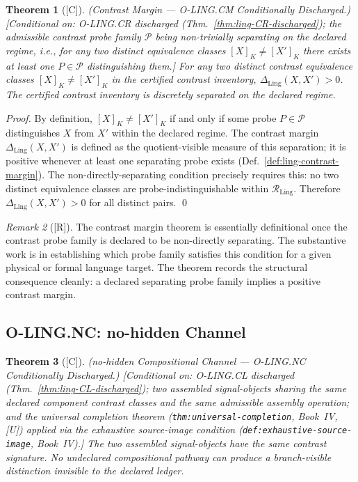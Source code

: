 \documentclass[12pt,oneside]{amsbook}
\theoremstyle{plain}
\newtheorem{theorem}{Theorem}[section]
\theoremstyle{definition}
\theoremstyle{remark}
\newtheorem{remark}[theorem]{Remark}
\newcommand{\status}[1]{\textup{[#1]}}
\begin{document}
\begin{theorem}[\status{C}]\label{thm:ling-CM-discharged}
\textup{(Contrast Margin --- O-LING.CM Conditionally Discharged.)}
\textup{[Conditional on: O-LING.CR discharged
(Thm.~\ref{thm:ling-CR-discharged}); the admissible contrast probe
family $\mathcal{P}$ being non-trivially separating on the declared
regime, i.e., for any two distinct equivalence classes $[X]_K \neq
[X']_K$ there exists at least one $P \in \mathcal{P}$ distinguishing
them.]}
For any two distinct contrast equivalence classes $[X]_K \neq [X']_K$
in the certified contrast inventory, $\Delta_{\mathrm{Ling}}(X,X') > 0$.
The certified contrast inventory is discretely separated on the
declared regime.
\end{theorem}

\begin{proof}
By definition, $[X]_K \neq [X']_K$ if and only if some probe
$P \in \mathcal{P}$ distinguishes $X$ from $X'$ within the declared
regime. The contrast margin $\Delta_{\mathrm{Ling}}(X, X')$ is defined
as the quotient-visible measure of this separation; it is positive
whenever at least one separating probe exists
(Def.~\ref{def:ling-contrast-margin}). The non-directly-separating
condition precisely requires this: no two distinct equivalence classes
are probe-indistinguishable within $\mathcal{R}_{\mathrm{Ling}}$.
Therefore $\Delta_{\mathrm{Ling}}(X,X') > 0$ for all distinct pairs.
\qed
\end{proof}

\begin{remark}[\status{R}]\label{rem:ling-CM-note}
The contrast margin theorem is essentially definitional once the
contrast probe family is declared to be non-directly separating. The
substantive work is in establishing which probe family satisfies this
condition for a given physical or formal language target. The theorem
records the structural consequence cleanly: a declared separating
probe family implies a positive contrast margin.
\end{remark}

\subsection{O-LING.NC: no-hidden Channel}\label{sec:ling-NC-discharge}

\begin{theorem}[\status{C}]\label{thm:ling-NC-discharged}
\textup{(no-hidden Compositional Channel --- O-LING.NC Conditionally Discharged.)}
\textup{[Conditional on: O-LING.CL discharged
(Thm.~\ref{thm:ling-CL-discharged}); two assembled signal-objects
sharing the same declared component contrast classes and the same
admissible assembly operation; and the universal completion theorem
(\texttt{thm:universal-completion}, Book~IV, [U]) applied via the
exhaustive source-image condition
(\texttt{def:exhaustive-source-image}, Book~IV).]}
The two assembled signal-objects have the same contrast signature.
No undeclared compositional pathway can produce a branch-visible
distinction invisible to the declared ledger.
\end{theorem}
\end{document}
